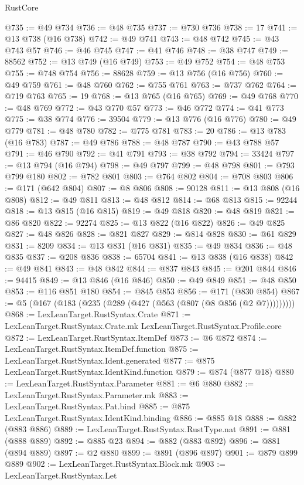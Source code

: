 \begin{lexlean}{RustCore}
\begin{coremodule}
@735 := @49 @734
@736 := @48 @735
@737 := @730 @736
@738 := 17
@741 := @13 @738 (@16 @738)
@742 := @49 @741
@743 := @48 @742
@745 := @43 @743 @57
@746 := @46 @745
@747 := @41 @746
@748 := @38 @747
@749 := 88562
@752 := @13 @749 (@16 @749)
@753 := @49 @752
@754 := @48 @753
@755 := @748 @754
@756 := 88628
@759 := @13 @756 (@16 @756)
@760 := @49 @759
@761 := @48 @760
@762 := @755 @761
@763 := @737 @762
@764 := @719 @763
@765 := 19
@768 := @13 @765 (@16 @765)
@769 := @49 @768
@770 := @48 @769
@772 := @43 @770 @57
@773 := @46 @772
@774 := @41 @773
@775 := @38 @774
@776 := 39504
@779 := @13 @776 (@16 @776)
@780 := @49 @779
@781 := @48 @780
@782 := @775 @781
@783 := 20
@786 := @13 @783 (@16 @783)
@787 := @49 @786
@788 := @48 @787
@790 := @43 @788 @57
@791 := @46 @790
@792 := @41 @791
@793 := @38 @792
@794 := 33424
@797 := @13 @794 (@16 @794)
@798 := @49 @797
@799 := @48 @798
@801 := @793 @799 @180
@802 := @782 @801
@803 := @764 @802
@804 := @708 @803
@806 := @171 (@642 @804)
@807 := @8 @806
@808 := 90128
@811 := @13 @808 (@16 @808)
@812 := @49 @811
@813 := @48 @812
@814 := @68 @813
@815 := 92244
@818 := @13 @815 (@16 @815)
@819 := @49 @818
@820 := @48 @819
@821 := @86 @820
@822 := 92274
@825 := @13 @822 (@16 @822)
@826 := @49 @825
@827 := @48 @826
@828 := @821 @827
@829 := @814 @828
@830 := @61 @829
@831 := 8209
@834 := @13 @831 (@16 @831)
@835 := @49 @834
@836 := @48 @835
@837 := @208 @836
@838 := 65704
@841 := @13 @838 (@16 @838)
@842 := @49 @841
@843 := @48 @842
@844 := @837 @843
@845 := @201 @844
@846 := 94415
@849 := @13 @846 (@16 @846)
@850 := @49 @849
@851 := @48 @850
@853 := @116 @851 @180
@854 := @845 @853
@856 := @171 (@830 @854)
@867 := @5 (@167 (@183 (@235 (@289 (@427 (@563 (@807 (@8 @856 (@2 @7)))))))))
@868 := LexLeanTarget.RustSyntax.Crate
@871 := LexLeanTarget.RustSyntax.Crate.mk LexLeanTarget.RustSyntax.Profile.core
@872 := LexLeanTarget.RustSyntax.ItemDef
@873 := @6 @872
@874 := LexLeanTarget.RustSyntax.ItemDef.function
@875 := LexLeanTarget.RustSyntax.Ident.generated
@877 := @875 LexLeanTarget.RustSyntax.IdentKind.function
@879 := @874 (@877 @18)
@880 := LexLeanTarget.RustSyntax.Parameter
@881 := @6 @880
@882 := LexLeanTarget.RustSyntax.Parameter.mk
@883 := LexLeanTarget.RustSyntax.Pat.bind
@885 := @875 LexLeanTarget.RustSyntax.IdentKind.binding
@886 := @885 @18
@888 := @882 (@883 @886)
@889 := LexLeanTarget.RustSyntax.RustType.nat
@891 := @881 (@888 @889)
@892 := @885 @23
@894 := @882 (@883 @892)
@896 := @881 (@894 @889)
@897 := @2 @880
@899 := @891 (@896 @897)
@901 := @879 @899 @889
@902 := LexLeanTarget.RustSyntax.Block.mk
@903 := LexLeanTarget.RustSyntax.Let

\end{coremodule}
\end{lexlean}
